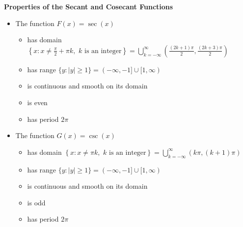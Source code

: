 \colorbox{ResultColor}{\bbm

\begin{thm} \label{secantcosecantfunctionprops}  \textbf{Properties of the Secant and Cosecant Functions}  

\begin{itemize}

\item  The function $F(x) = \sec(x)$

\begin{itemize}


\item has domain $\left\{ x : x \neq \frac{\pi}{2} + \pi k, \, \,  \text{$k$ is an integer} \right\} = \displaystyle{\bigcup_{k=-\infty}^{\infty} \left(\frac{(2k+1) \pi}{2}, \frac{(2k+3) \pi}{2}\right)}$

\item has range $\{ y : |y| \geq 1 \} = (-\infty, -1] \cup [1, \infty)$

\item  is continuous and smooth on its domain

\item is even

\item has period $2\pi$

\end{itemize}

\item  The function $G(x) = \csc(x)$

\begin{itemize}

\item has domain $\left\{ x : x \neq \pi  k, \, \,  \text{$k$ is an integer} \right\} = \displaystyle{\bigcup_{k=-\infty}^{\infty}\left(k\pi, (k+1) \pi \right)}$

\item has range $\{ y : |y| \geq 1 \} = (-\infty, -1] \cup [1, \infty)$

\item  is continuous and smooth on its domain

\item is odd

\item has period $2\pi$

\end{itemize}

\end{itemize}

\end{thm}

\ebm}

